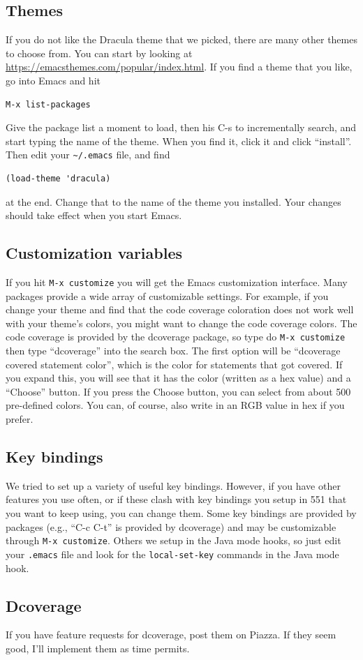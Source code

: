 \documentclass[12pt]{article}
\begin{document}
\subsection{Themes}
If you do not like the Dracula theme that we picked, there
are many other themes to choose from.  You can start by looking
at \url{https://emacsthemes.com/popular/index.html}.
If you find a theme that you like, go into Emacs and hit
\begin{verbatim}
M-x list-packages
\end{verbatim}

Give the package list a moment to load, then his C-s to incrementally
search, and start typing the name of the theme.  When you find it, click
it and click ``install''.  Then edit your \verb+~/.emacs+ file,
and find
\begin{verbatim}
(load-theme 'dracula)
\end{verbatim}
at the end.  Change that to the name of the theme you installed.  Your
changes should take effect when you start Emacs.

\subsection{Customization variables}
If you hit \verb+M-x customize+ you will get the Emacs customization
interface.  Many packages provide a wide array of customizable settings.
For example, if you change your theme and find that the code coverage
coloration does not work well with your theme's colors, you might
want to change the code coverage colors.  The code coverage is provided
by the dcoverage package, so type do \verb+M-x customize+ then
type ``dcoverage'' into the search box.  The first option will be
``dcoverage covered statement color'', which is the color for statements
that got covered.  If you expand this, you will see that it has the
color (written as a hex value) and a ``Choose'' button.  If you press
the Choose button, you can select from about 500 pre-defined colors.
You can, of course, also write in an RGB value in hex if you prefer.


\subsection{Key bindings}
We tried to set up a variety of useful key bindings.  However, if you
have other features you use often, or if these clash with key bindings you
setup in 551 that you want to keep using, you can change them.
Some key bindings are provided by packages (e.g., ``C-c C-t'' is
provided by dcoverage) and may be customizable through \verb+M-x customize+.
Others we setup in the Java mode hooks, so just edit your \verb+.emacs+ file
and look for the \verb+local-set-key+ commands in the Java mode hook.

\subsection{Dcoverage}
If you have feature requests for dcoverage, post them on Piazza.  If they
seem good, I'll implement them as time permits.
\end{document}

